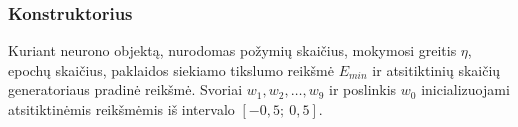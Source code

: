 \subsubsection{Konstruktorius}
\label{subsubsec:konstruktorius}

Kuriant neurono objektą, nurodomas požymių skaičius, mokymosi greitis $\eta$, epochų skaičius, paklaidos siekiamo tikslumo reikšmė $E_{min}$ ir atsitiktinių skaičių generatoriaus pradinė reikšmė. Svoriai $w_1, w_2, \dots, w_9$ ir poslinkis $w_0$ inicializuojami atsitiktinėmis reikšmėmis iš intervalo $[-0{,}5;\ 0{,}5]$.